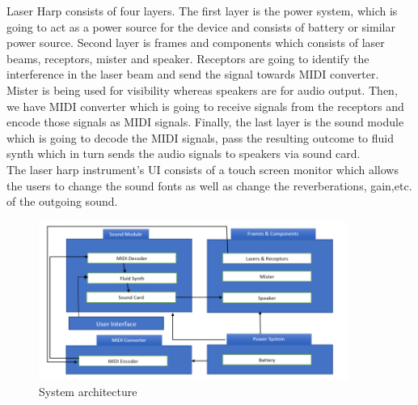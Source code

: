 Laser Harp consists of four layers. The first layer is the power system, which is going to act as a power source for the device and consists of battery or similar power source. Second layer is frames and components which consists of laser beams, receptors, mister and speaker.  Receptors are going to identify the interference in the laser beam and send the signal towards MIDI converter.  Mister is being used for visibility whereas speakers are for audio output.  Then, we have MIDI converter which is going to receive signals from the receptors and encode those signals as MIDI signals.  Finally, the last layer is the sound module which is going to decode the MIDI signals, pass the resulting outcome to fluid synth which in turn sends the audio signals to speakers via sound card.\\

The laser harp instrument's UI consists of a touch screen monitor which allows the users to change the sound fonts as well as change the reverberations, gain,etc. of the outgoing sound.

\begin{figure}[h!]
	\centering
 	\includegraphics[width=0.90\textwidth]{images/data_flow.png}
 \caption{System architecture}
\end{figure}
